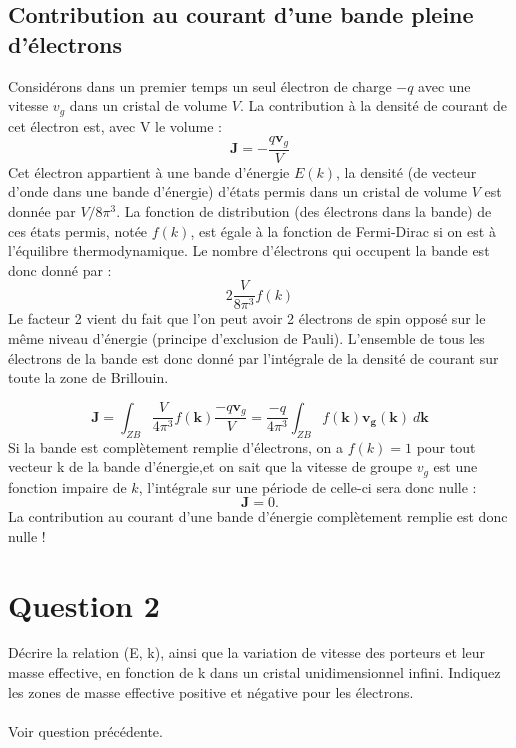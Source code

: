 \subsection{Contribution au courant d'une bande pleine d'électrons}
Considérons dans un premier temps un seul électron de charge $-q$ avec une vitesse $v_g$ dans un cristal de volume $V$. La contribution à la densité de courant de cet électron est, avec V le volume :
\begin{equation}
\mathbf{J}=-\frac{q\mathbf v_g}{V}
\end{equation}
Cet électron appartient à une bande d'énergie $E(k)$, la densité (de vecteur d'onde dans une bande d'énergie) d'états permis dans un cristal de volume $V$ est donnée par $V/8\pi^3$. La fonction de distribution (des électrons dans la bande) de ces états permis, notée $f(k)$, est égale à la fonction de Fermi-Dirac si on est à l'équilibre thermodynamique. Le nombre d'électrons qui occupent la bande est donc donné par :
\begin{equation}
2\frac{V}{8\pi ^3} f(k)
\end{equation}
Le facteur 2 vient du fait que l'on peut avoir 2 électrons de spin opposé sur le même niveau d'énergie (principe d'exclusion de Pauli). L'ensemble de tous les électrons de la bande est donc donné par l'intégrale de la densité de courant sur toute la zone de Brillouin.

\begin{equation}
\mathbf{J} =\int_{ZB}\frac{V}{4\pi^3}f(\mathbf{k})\frac{-q\mathbf v_g}{V}=\frac{-q}{4\pi^3}\int_{ZB}f(\mathbf{k}) \mathbf{v_g}(\mathbf{k}) \ d\mathbf{k}
\end{equation}
Si la bande est complètement remplie d'électrons, on a $f(k)=1$ pour tout vecteur k de la bande d'énergie,et on sait que la vitesse de groupe $v_g$ est une fonction impaire de $k$, l'intégrale sur une période de celle-ci sera donc nulle :
\begin{equation}
\mathbf{J}=0.
\end{equation}
La contribution au courant d'une bande d'énergie complètement remplie est donc nulle !
\section{Question 2}
Décrire la relation (E, k), ainsi que la variation de vitesse des porteurs et leur masse
effective, en fonction de k dans un cristal unidimensionnel infini. Indiquez les zones de
masse effective positive et négative pour les électrons.
\\
\hbox{}
\\
Voir question précédente.
